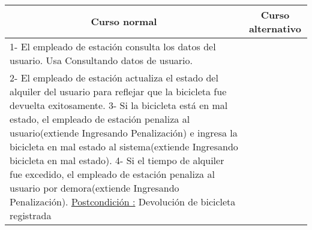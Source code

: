 ~

\begin{center}
    \centering
    \begin{tabular}{ | p{11cm} | p{6cm} | }
    	\multicolumn{1}{c}{\cellcolor{black!30}\textbf{Curso normal}} & 
    	\multicolumn{1}{c}{\cellcolor{black!30}\textbf{Curso alternativo}} \\
		\hline
		1- El empleado de estación consulta los datos del usuario. Usa Consultando datos de usuario. &  \\ \hline
		2- El empleado de estación actualiza el estado del alquiler del usuario para reflejar que la bicicleta fue devuelta exitosamente.
		3- Si la bicicleta está en mal estado, el empleado de estación penaliza al usuario(extiende Ingresando Penalización) e ingresa la bicicleta en mal estado al sistema(extiende Ingresando bicicleta en mal estado).		
		4- Si el tiempo de alquiler fue excedido, el empleado de estación penaliza al usuario por demora(extiende Ingresando Penalización).
		\underline{Postcondición :} Devolución de bicicleta registrada & \\ \hline
    \end{tabular}
\end{center}

